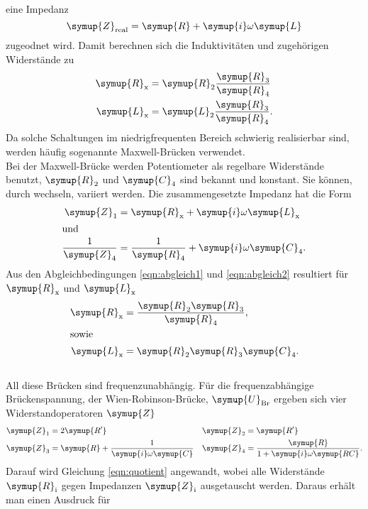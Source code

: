 \\
eine Impedanz
\begin{equation}
  \symup{Z}_\text{real} = \symup{R} + \symup{i} \omega \symup{L}
\end{equation}
zugeodnet wird.
Damit berechnen sich die Induktivitäten und zugehörigen Widerstände zu
\begin{align}
  \symup{R}_\text{x} &= \symup{R}_2 \frac{\symup{R}_3}{\symup{R}_4}
  \label{eqn:indur} \\
  \symup{L}_\text{x} &= \symup{L}_2 \frac{\symup{R}_3}{\symup{R}_4} .
  \label{eqn:indul}
\end{align}
Da solche Schaltungen im niedrigfrequenten Bereich schwierig realisierbar sind,
werden häufig sogenannte Maxwell-Brücken verwendet.
\\
Bei der Maxwell-Brücke werden Potentiometer als regelbare Widerstände benutzt,
$\symup{R}_2$ und $\symup{C}_4$ sind bekannt und konstant. Sie können, durch wechseln, variiert werden.
Die zusammengesetzte Impedanz hat die Form
\begin{align}
  \symup{Z}_1 &= \symup{R}_\text{x} + \symup{i}\omega\symup{L}_\text{x} \\
\shortintertext{und}
  \frac{1}{\symup{Z}_4} &= \frac{1}{\symup{R}_4} + \symup{i}\omega\symup{C}_4 .
\end{align}
Aus den Abgleichbedingungen \eqref{eqn:abgleich1} und \eqref{eqn:abgleich2}
resultiert für $\symup{R}_\text{x}$ und $\symup{L}_\text{x}$
\begin{align}
  \symup{R}_\text{x} &= \frac{\symup{R}_2 \symup{R}_3}{\symup{R}_4},
  \label{eqn:maxr} \\
\shortintertext{sowie}
  \symup{L}_\text{x} &= \symup{R}_2 \symup{R}_3 \symup{C}_4.
  \label{eqn:maxl}
\end{align}
\\
All diese Brücken sind frequenzunabhängig.
Für die frequenzabhängige Brückenspannung, der Wien-Robinson-Brücke,
$\symup{U}_\text{Br}$ ergeben sich vier Widerstandoperatoren $\symup{Z}$
\begin{align}
  \symup{Z}_1 &= 2\symup{R'} & \symup{Z}_2 &= \symup{R'}\\
  \symup{Z}_3 &= \symup{R} + \frac{1}{\symup{i}\omega\symup{C}}
  & \symup{Z}_4 &= \frac{\symup{R}}{1 + \symup{i} \omega \symup{RC}} .
\end{align}
Darauf wird Gleichung \eqref{eqn:quotient} angewandt, wobei alle Widerstände
$\symup{R}_\text{i}$ gegen Impedanzen $\symup{Z}_\text{i}$ ausgetauscht werden.
Daraus erhält man einen Ausdruck für
